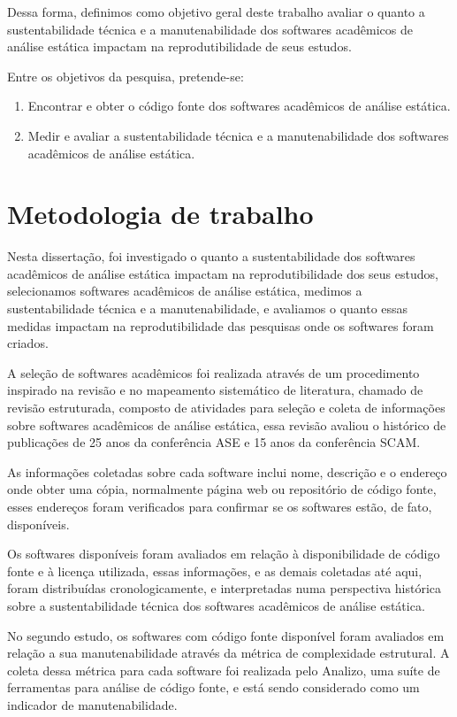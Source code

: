Dessa forma, definimos como objetivo geral deste trabalho avaliar o quanto a
sustentabilidade técnica e a manutenabilidade dos softwares acadêmicos de
análise estática impactam na reprodutibilidade de seus estudos.

Entre os objetivos da pesquisa, pretende-se:

\begin{enumerate}
  \item Encontrar e obter o código fonte dos softwares acadêmicos de análise
        estática.
  \item Medir e avaliar a sustentabilidade técnica e a manutenabilidade dos
        softwares acadêmicos de análise estática.
\end{enumerate}

\section{Metodologia de trabalho}

Nesta dissertação, foi investigado o quanto a sustentabilidade dos softwares
acadêmicos de análise estática impactam na reprodutibilidade dos seus estudos,
selecionamos softwares acadêmicos de análise estática, medimos a
sustentabilidade técnica e a manutenabilidade, e avaliamos o quanto essas medidas
impactam na reprodutibilidade das pesquisas onde os softwares foram criados.

A seleção de softwares acadêmicos foi realizada através de um procedimento
inspirado na revisão e no mapeamento sistemático de literatura, chamado de
revisão estruturada, composto de atividades para seleção e coleta de
informações sobre softwares acadêmicos de análise estática, essa revisão
avaliou o histórico de publicações de 25 anos da conferência ASE e 15 anos da
conferência SCAM.

As informações coletadas sobre cada software inclui nome, descrição e o
endereço onde obter uma cópia, normalmente página web ou repositório de código
fonte, esses endereços foram verificados para confirmar se os softwares estão,
de fato, disponíveis.

Os softwares disponíveis foram avaliados em relação à disponibilidade de código
fonte e à licença utilizada, essas informações, e as demais coletadas até aqui,
foram distribuídas cronologicamente, e interpretadas numa perspectiva histórica
sobre a sustentabilidade técnica dos softwares acadêmicos de análise estática.

No segundo estudo, os softwares com código fonte disponível foram avaliados em
relação a sua manutenabilidade através da métrica de complexidade estrutural. A
coleta dessa métrica para cada software foi realizada pelo Analizo, uma suíte
de ferramentas para análise de código fonte, e está sendo considerado como um
indicador de manutenabilidade.

